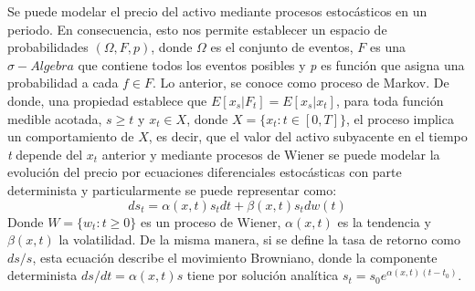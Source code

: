 \documentclass[12pt]{article}
\begin{document}
Se puede modelar el precio del activo mediante procesos estocásticos en un periodo. En consecuencia, esto nos permite establecer un espacio de probabilidades $(\Omega, F,\textit{p})$, donde $\Omega$ es el conjunto de eventos, $F$ es una $\sigma-Algebra$ que contiene todos los eventos posibles y \textit{p} es función que asigna una probabilidad a cada $\textit{f} \in F$. Lo anterior, se conoce como proceso de Markov. De donde, una propiedad establece que $E[x_s|F_t] = E[x_s|x_t]$, para toda función medible acotada, $s \geq t$ y $x_t \in X$, donde $X = \{ x_t : t \in [0,\textit{T}] \}$, el proceso implica un comportamiento de $X$, es decir, que el valor del activo subyacente en el tiempo \textit{t} depende del $x_t$ anterior y mediante procesos de Wiener se puede modelar la evolución del precio por ecuaciones diferenciales estocásticas con parte determinista y particularmente se puede representar como:  
\begin{equation}
ds_t = \alpha(x,t) s_t dt + \beta(x,t) s_t dw(t) 
\label{Ecu:01}
\end{equation}
Donde $W = \{w_t : t\geq 0\}$ es un proceso de Wiener, $\alpha(x,t)$ es la tendencia y $\beta(x,t)$ la volatilidad. De la misma manera, si se define la tasa de retorno como $ds/s$, esta ecuación describe el movimiento Browniano, donde la componente determinista $ds/dt=\alpha(x,t)s$ tiene por solución analítica $s_t = s_0 e^{\alpha(x,t)(t-t_0)}$.
\end{document}
